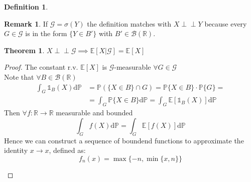 \documentclass[10pt,a4paper]{article}
\theoremstyle{definition}
\newtheorem{defi}{Definition}[section]
\newtheorem{teo}{Theorem}[section]
\newtheorem*{rem}{Remark}
\newcommand{\indep}{\perp \!\!\! \perp}
\newcommand{\ind}{\mathds{1}}
\begin{document}
\begin{enumerate}
\begin{defi}
\begin{equation*}
	\end{equation*}
\end{defi}
\begin{rem}
	If $\mathcal{G}=\sigma(Y)$ the definition matches with $X \indep Y$ because every $ G\in  \mathcal{G} $ is in the form $\{Y\in B'\}$ with $B'\in \mathcal{B}(\mathbb{R})$.
\end{rem}
\begin{teo}
	 $X \indep \mathcal{G} \implies \mathbb{E}[X|\mathcal{G}]=\mathbb{E}[X]$
\end{teo}
\begin{proof}
	The constant r.v. $ \mathbb{E}[X] $ is $\mathcal{G}$-measurable $ \forall G\in  \mathcal{G} $ \\
	Note that $ \forall B\in  \mathcal{B}(\mathbb{R}) $
	\begin{equation*}
		\begin{split}
			\int_{G}\ind_B (X)\mathrm{d}\mathbb{P}&=\mathbb{P}\left(\{X\in B\}\cap G\right)=\mathbb{P}\{X\in B\}\cdot \mathbb{P}\{G\}=\\
			&=\int_{G}\mathbb{P}\{X\in B\}\mathrm{d}\mathbb{P}=\int_{G}\mathbb{E}[\ind_B (X)]\mathrm{d}\mathbb{P}
		\end{split}		
	\end{equation*}
Then $\forall f:\mathbb{R}\to\mathbb{R}$ measurable and bounded
\begin{equation*}
	\int_{G}f (X)\mathrm{d}\mathbb{P}=\int_{G}\mathbb{E}[f (X)]\mathrm{d}\mathbb{P}
\end{equation*}
Hence we can construct a sequence of boundend functions to approximate the identity $x\to x$, defined as:
\begin{equation*}
	f_n(x)=\max \{-n,\min \{x,n\}\}
\end{equation*}
\begin{figure}[htpb]
	\centering
\end{figure}
\end{proof}
\end{enumerate}
\end{document}
